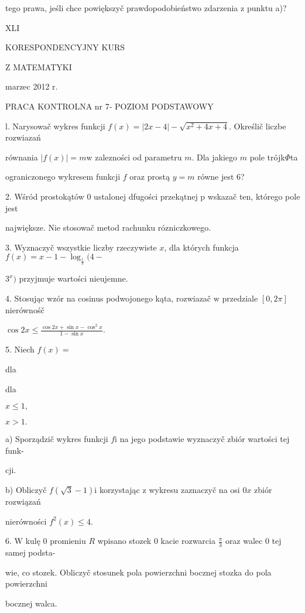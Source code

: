 \documentclass[a4paper,12pt]{article}
\begin{document}
tego prawa, jeśli chce powiększyč prawdopodobieństwo zdarzenia $\mathrm{z}$ punktu a)?





XLI

KORESPONDENCYJNY KURS

Z MATEMATYKI

marzec 2012 r.

PRACA KONTROLNA nr 7- POZIOM PODSTAWOWY

l. Narysowač wykres funkcji $f(x) = |2x-4|-\sqrt{x^{2}+4x+4}$. Określič liczbe rozwiazań

równania $|f(x)| = m \mathrm{w}$ zalezności od parametru $m$. Dla jakiego $m$ pole trójk$\Phi$ta

ograniczonego wykresem funkcji $f$ oraz prostą $y=m$ równe jest 6?

2. Wśród prostokątów 0 ustalonej dfugości przekątnej p wskazač ten, którego pole jest

największe. Nie stosowač metod rachunku rózniczkowego.

3. Wyznaczyč wszystkie liczby rzeczywiste $x$, dla których funkcja $f(x)=x-1-\log_{\frac{1}{3}}(4-$

$3^{x})$ przyjmuje wartości nieujemne.

4. Stosując wzór na cosinus podwojonego kąta, rozwiazač $\mathrm{w}$ przedziale $[0,2\pi]$ nierównośč

$\displaystyle \cos 2x\leq\frac{\cos 2x+\sin x-\cos^{2}x}{1-\sin x}.$

5. Niech $f(x)=$

dla

dla

$x\leq 1,$

$x>1.$

a) Sporządzič wykres funkcji $f\mathrm{i}$ na jego podstawie wyznaczyč zbiór wartości tej funk-

cji.

b) Obliczyč $f(\sqrt{3}-1) \mathrm{i}$ korzystając $\mathrm{z}$ wykresu zaznaczyč na osi $0x$ zbiór rozwiązań

nierówności $f^{2}(x)\leq 4.$

6. $\mathrm{W}$ kulę $0$ promieniu $R$ wpisano stozek $0$ kacie rozwarcia $\displaystyle \frac{\pi}{3}$ oraz walec $0$ tej samej podsta-

wie, co stozek. Obliczyč stosunek pola powierzchni bocznej stozka do pola powierzchni

bocznej walca.
\end{document}
